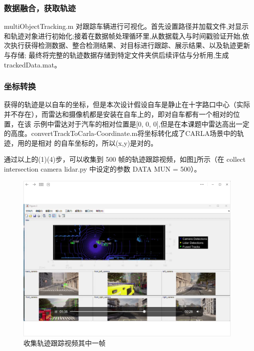 \subsubsection{数据融合，获取轨迹}

multiObjectTracking.m 对跟踪车辆进行可视化。首先设置路径并加载文件,对显示和轨迹对象进行初始化;接着在数据帧处理循环里,从数据载入与时间戳验证开始,依次执行获得检测数据、整合检测结果、对目标进行跟踪、展示结果、以及轨迹更新与存储; 最终将完整的轨迹数据存储到特定文件夹供后续评估与分析用,生成 trackedData.mat。

\subsubsection{坐标转换}

获得的轨迹是以自车的坐标，但是本次设计假设自车是静止在十字路口中心（实际 并不存在），而雷达和摄像机都是安装在自车上的，即对自车都有一个相对的位置，在该 示例中雷达对于汽车的相对位置是[0, 0, 0],但是在本课题中雷达高出一定的高度。convertTrackToCarla-Coordinate.m将坐标转化成了CARLA场景中的轨迹，用的是相对 的自车坐标的，所以(x,y)是对的。


通过以上的(1)(4)步，可以收集到 500 帧的轨迹跟踪视频，如图\ref{fig:p13}所示（在 collect intersection camera lidar.py 中设定的参数 DATA MUN = 500）。




\begin{figure}[htbp] %
	\centering
	\includegraphics[width=1\textwidth]{p13} %
	\caption{收集轨迹跟踪视频其中一帧} %
	\label{fig:p13} %
\end{figure}







